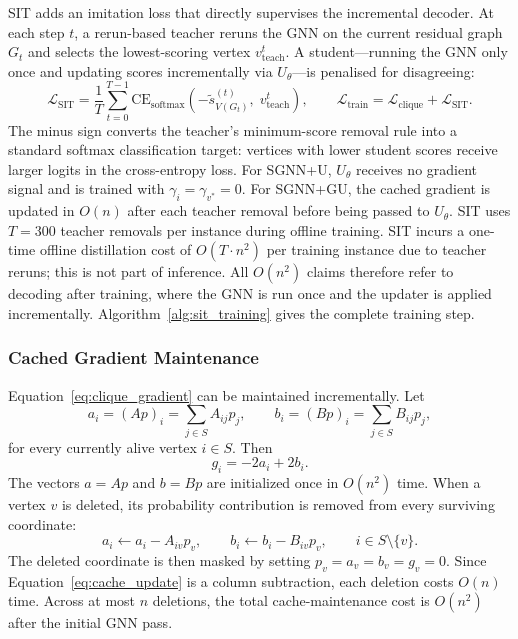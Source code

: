 \documentclass[mathematics,article,submit,pdftex,moreauthors]{Definitions/mdpi}
\begin{document}
SIT adds an imitation loss that directly supervises the incremental decoder. At each
step $t$, a rerun-based teacher reruns the GNN on the current residual graph $G_t$
and selects the lowest-scoring vertex $v^t_{\mathrm{teach}}$. A student---running
the GNN only once and updating scores incrementally via $U_\theta$---is penalised
for disagreeing:
\begin{equation}
  \mathcal{L}_{\mathrm{SIT}} = \frac{1}{T} \sum_{t=0}^{T-1}
  \mathrm{CE}_{\mathrm{softmax}}\!\left(-\tilde{s}^{(t)}_{V(G_t)},\;
  v^t_{\mathrm{teach}}\right),
  \qquad
  \mathcal{L}_{\mathrm{train}} = \mathcal{L}_{\mathrm{clique}} +
  \mathcal{L}_{\mathrm{SIT}}.
  \label{eq:sit_loss}
\end{equation}
The minus sign converts the teacher's minimum-score removal rule into a standard
softmax classification target: vertices with lower student scores receive larger
logits in the cross-entropy loss.
For \textsc{SGNN+U}, $U_\theta$ receives no gradient signal and is trained with
$\gamma_i = \gamma_{v^*} = 0$. For \textsc{SGNN+GU}, the cached gradient is updated in
$O(n)$ after each teacher removal before being passed to $U_\theta$. SIT uses
$T=300$ teacher removals per instance during offline training. SIT incurs a
one-time offline distillation cost of $O(T \cdot n^2)$ per training instance due
to teacher reruns; this is not part of inference.
All $O(n^2)$ claims therefore refer to
decoding after training, where the GNN is run once and the updater is applied
incrementally. Algorithm~\ref{alg:sit_training} gives the complete training step.

\subsubsection{Cached Gradient Maintenance}
\label{sec:cached_maintenance}

Equation~\eqref{eq:clique_gradient} can be maintained incrementally. Let
\[
  a_i = (Ap)_i = \sum_{j\in S} A_{ij}p_j,
  \qquad
  b_i = (Bp)_i = \sum_{j\in S} B_{ij}p_j,
\]
for every currently alive vertex $i\in S$. Then
\[
  g_i = -2a_i + 2b_i .
\]
The vectors $a=Ap$ and $b=Bp$ are initialized once in $O(n^2)$ time. When a vertex
$v$ is deleted, its probability contribution is removed from every surviving
coordinate:
\begin{equation}
  a_i \leftarrow a_i - A_{iv}p_v,
  \qquad
  b_i \leftarrow b_i - B_{iv}p_v,
  \qquad
  i\in S\setminus\{v\}.
  \label{eq:cache_update}
\end{equation}
The deleted coordinate is then masked by setting $p_v=a_v=b_v=g_v=0$. Since
Equation~\eqref{eq:cache_update} is a column subtraction, each deletion costs
$O(n)$ time. Across at most $n$ deletions, the total cache-maintenance cost is
$O(n^2)$ after the initial GNN pass.
\end{document}
